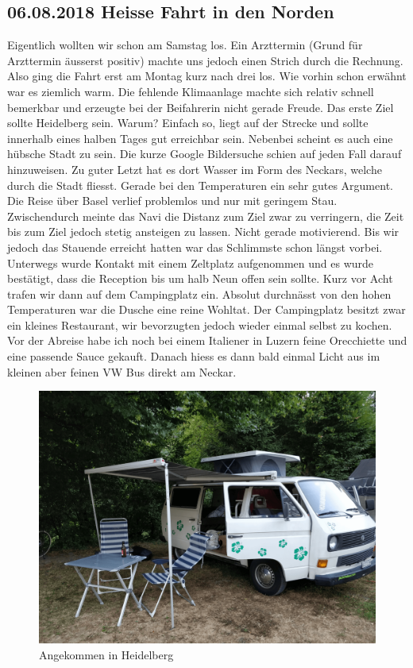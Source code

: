 \subsection{06.08.2018 Heisse Fahrt in den Norden} 
Eigentlich wollten wir schon am Samstag los. Ein Arzttermin (Grund für Arzttermin äusserst positiv) machte uns jedoch einen Strich durch die Rechnung.
Also ging die Fahrt erst am Montag kurz nach drei los.
Wie vorhin schon erwähnt war es ziemlich warm.
Die fehlende Klimaanlage machte sich relativ schnell bemerkbar und erzeugte bei der Beifahrerin nicht gerade Freude.
Das erste Ziel sollte Heidelberg sein.
Warum?
Einfach so, liegt auf der Strecke und sollte innerhalb eines halben Tages gut erreichbar sein.
Nebenbei scheint es auch eine hübsche Stadt zu sein. 
Die kurze Google Bildersuche schien auf jeden Fall darauf hinzuweisen.
Zu guter Letzt hat es dort Wasser im Form des Neckars, welche durch die Stadt fliesst.
Gerade bei den Temperaturen ein sehr gutes Argument.
Die Reise über Basel verlief problemlos und nur mit geringem Stau.
Zwischendurch meinte das Navi die Distanz zum Ziel zwar zu verringern, die Zeit bis zum Ziel jedoch stetig ansteigen zu lassen.
Nicht gerade motivierend.
Bis wir jedoch das Stauende erreicht hatten war das Schlimmste schon längst vorbei.
Unterwegs wurde Kontakt mit einem Zeltplatz aufgenommen und es wurde bestätigt, dass die Reception bis um halb Neun offen sein sollte.
Kurz vor Acht trafen wir dann auf dem Campingplatz ein.
Absolut durchnässt von den hohen Temperaturen war die Dusche eine reine Wohltat.
Der Campingplatz besitzt zwar ein kleines Restaurant, wir bevorzugten jedoch wieder einmal selbst zu kochen.
Vor der Abreise habe ich noch bei einem Italiener in Luzern feine Orecchiette und eine passende Sauce gekauft.
Danach hiess es dann bald einmal Licht aus im kleinen aber feinen VW Bus direkt am Neckar.

\begin{figure}[hb]
    \centering
    \includegraphics[width=\textwidth]{../Bilder/Sylt/3.png}
    \caption{Angekommen in Heidelberg}
    \label{img:Heidelberg_1}
\end{figure}

